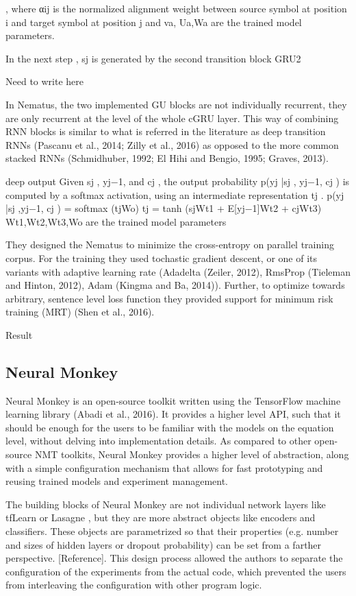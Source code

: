 , where αij is the normalized alignment weight between source symbol at position i and target symbol at position j and va, Ua,Wa are the trained model parameters.

In the next step , sj is generated by the second transition block GRU2 

Need to write here

In Nematus, the two implemented GU blocks are not individually recurrent, they are only recurrent at the level of the whole cGRU layer. This way of combining RNN blocks is similar to what is referred in the literature as deep transition RNNs (Pascanu et al., 2014; Zilly et al., 2016) as opposed to the more common stacked RNNs (Schmidhuber, 1992; El Hihi and Bengio, 1995; Graves, 2013).

deep output Given sj , yj−1, and cj , the output probability p(yj |sj , yj−1, cj ) is computed by a softmax activation, using an intermediate representation tj . p(yj |sj ,yj−1, cj ) = softmax (tjWo) tj = tanh (sjWt1 + E[yj−1]Wt2 + cjWt3) Wt1,Wt2,Wt3,Wo are the trained model parameters


They designed the Nematus to minimize the cross-entropy on parallel training corpus. For the training they used tochastic gradient descent, or one of its variants with adaptive learning rate (Adadelta (Zeiler, 2012), RmsProp (Tieleman and Hinton, 2012), Adam (Kingma and Ba, 2014)). Further, to optimize towards arbitrary, sentence level loss function they provided support for minimum risk training (MRT) (Shen et al., 2016). 

Result

\subsection{Neural Monkey}
Neural Monkey is an open-source toolkit written using the TensorFlow machine learning library (Abadi et al., 2016). It provides a higher level API, such that it should be enough for the users to be familiar with the models on the equation level, without delving into implementation details. As compared to other open-source NMT toolkits, Neural Monkey provides a higher level of abstraction, along with a simple configuration mechanism that allows for fast prototyping and reusing trained models and experiment management.

The building blocks of Neural Monkey are not individual network layers like tfLearn or Lasagne , but they are more abstract objects like encoders and classifiers. These objects are parametrized so that their properties (e.g. number and sizes of hidden layers or dropout probability) can be set from a farther perspective. [Reference]. This design process allowed the authors to separate the configuration of the experiments from the actual code, which prevented the users from interleaving the configuration with other program logic. 





